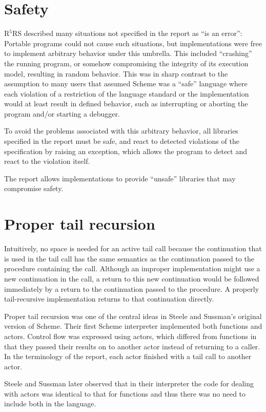 \documentclass[twoside,twocolumn]{algol60}
\newcommand{\rn}[1]{R$^{#1}$RS}
\begin{document}
\section{Safety}

\rn{5} described many situations not specified in the report as ``is
an error'': Portable programs could not cause such situations, but
implementations were free to implement arbitrary behavior under this
umbrella.  This included ``crashing'' the running program, or
somehow compromising the integrity of its execution model, resulting
in random behavior.  This was in sharp contrast to the assumption to
many users that assumed Scheme was a ``safe'' language where each
violation of a restriction of the language standard or the
implementation would at least result in defined behavior, such as
interrupting or aborting the program and/or starting a debugger.

To avoid the problems associated with this arbitrary behavior, all
libraries specified in the report must be safe, and react to
detected violations of the specification by raising
an exception, which allows the program to detect and react
to the violation itself.

The report allows implementations to provide ``unsafe'' libraries that
may compromise safety.

\section{Proper tail recursion}

Intuitively, no space is needed for an active tail call because the
continuation that is used in the tail call has the same semantics as the
continuation passed to the procedure containing the call.  Although an improper
implementation might use a new continuation in the call, a return
to this new continuation would be followed immediately by a return
to the continuation passed to the procedure.  A properly tail-recursive
implementation returns to that continuation directly.

Proper tail recursion was one of the central ideas in Steele and
Sussman's original version of Scheme.  Their first Scheme interpreter
implemented both functions and actors.  Control flow was expressed using
actors, which differed from functions in that they passed their results
on to another actor instead of returning to a caller.  In the terminology
of the report, each actor finished with a tail call to another actor.

Steele and Sussman later observed that in their interpreter the code
for dealing with actors was identical to that for functions and thus
there was no need to include both in the language.
\end{document}
